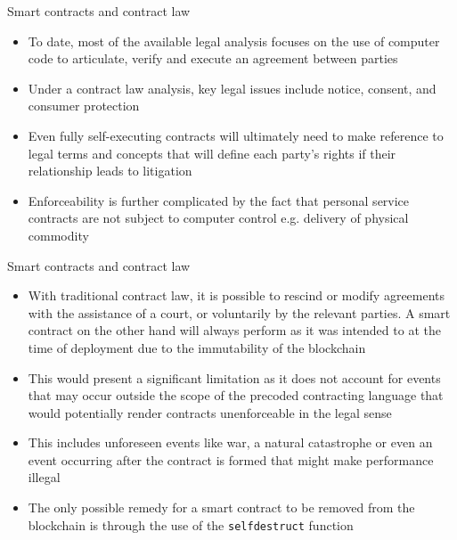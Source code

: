 \documentclass[11pt]{beamer}
\begin{document}

\begin{frame}{Smart contracts and contract law}
	\begin{itemize}
		\item To date, most of the available legal analysis focuses on the use of computer code to articulate, verify and execute an agreement between parties
		\item Under a contract law analysis, key legal issues include notice, consent, and consumer protection
		\item Even fully self-executing contracts will ultimately need to make reference to legal terms and concepts that will define each party's rights if their relationship leads to litigation
		\item Enforceability is further complicated by the fact that personal service contracts are not subject to computer control e.g. delivery of physical commodity
	\end{itemize}
\end{frame}


\begin{frame}{Smart contracts and contract law}
	\begin{itemize}
		\item With traditional contract law, it is possible to rescind or modify agreements with the assistance of a court, or voluntarily by the relevant parties. A smart contract on the other hand will always perform as it was intended to at the time of deployment due to the immutability of the blockchain
		\item This would present a significant limitation as it does not account for events that may occur outside the scope of the precoded contracting language that would potentially render contracts unenforceable in the legal sense
		\item This includes unforeseen events like war, a natural catastrophe or even an event occurring after the contract is formed that might make performance illegal
		\item The only possible remedy for a smart contract to be removed from the blockchain is through the use of the \texttt{selfdestruct} function
	\end{itemize}
\end{frame}

\end{document}
